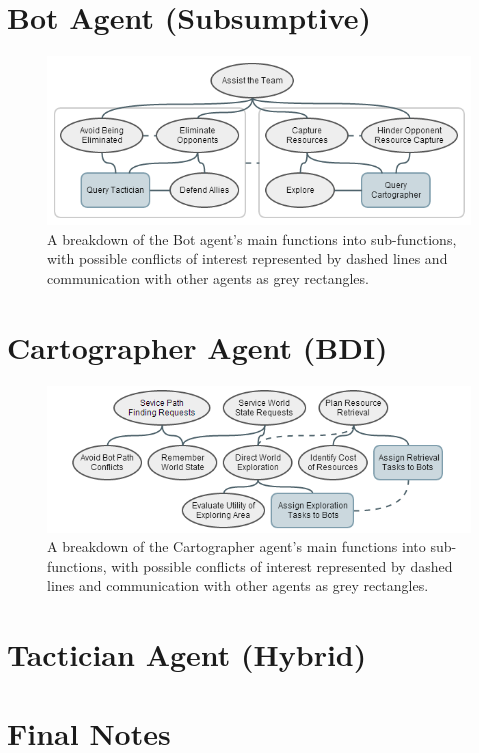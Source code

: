 \documentclass[a4paper,10pt]{article}
\begin{document}
\section{Bot Agent (Subsumptive)}
\begin{figure}[ht]
  \centering
  \includegraphics[width=0.8\linewidth]{bot}
  \begin{minipage}[t]{0.8\textwidth}
    \caption{A breakdown of the Bot agent's main functions into sub-functions, with possible conflicts of interest represented by dashed lines and communication with other agents as grey rectangles.}
  \end{minipage}
\end{figure}

\section{Cartographer Agent (BDI)}
\begin{figure}[ht]
  \centering
  \includegraphics[width=0.8\linewidth]{cartographer}
  \begin{minipage}[t]{0.8\textwidth}
    \caption{A breakdown of the Cartographer agent's main functions into sub-functions, with possible conflicts of interest represented by dashed lines and communication with other agents as grey rectangles.}
  \end{minipage}
\end{figure}

\section{Tactician Agent (Hybrid)}

\section{Final Notes}
\end{document}
